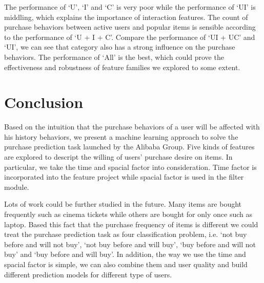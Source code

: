 \documentclass{llncs}
\begin{document}
The performance of `U', `I' and `C' is very poor while the performance of `UI' is middling,
which explains the importance of interaction features.
The count of purchase behaviors between active users and popular items is sensible
according to the performance of `U + I + C'.
Compare the performance of `UI + UC' and `UI', we can see that
category also has a strong influence on the purchase behaviors.
The performance of `All' is the best, which could prove the effectiveness and
robustness of feature families we explored to some extent.


\section{Conclusion}
Based on the intuition that the purchase behaviors of a user
will be affected with his history behaviors,
we present a machine learning approach to solve
the purchase prediction task launched by the Alibaba Group.
Five kinds of features are explored to descript
the willing of users' purchase desire on items.
In particular, we take the time and spacial factor into consideration.
Time factor is incorporated into the feature project while
spacial factor is used in the filter module.

Lots of work could be further studied in the future.
Many items are bought frequently such as cinema tickets
while others are bought for only once such as laptop.
Based this fact that the purchase frequency of items is different
we could treat the purchase prediction task
as four classification problem, i.e.
`not buy before and will not buy', `not buy before and will buy',
`buy before and will not buy' and `buy before and will buy'.
In addition, the way we use the time and spacial factor is simple,
we can also combine them and user quality
and build different prediction models for different type of users.



\end{document}
